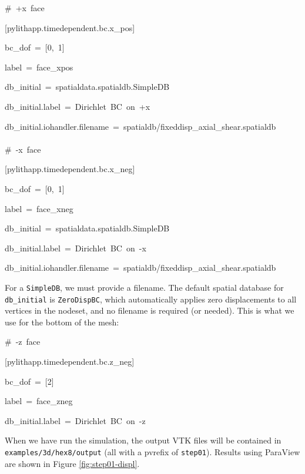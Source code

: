 \begin{lyxcode}
\#~+x~face

{[}pylithapp.timedependent.bc.x\_pos{]}

bc\_dof~=~{[}0,~1{]}

label~=~face\_xpos

db\_initial~=~spatialdata.spatialdb.SimpleDB

db\_initial.label~=~Dirichlet~BC~on~+x

db\_initial.iohandler.filename~=~spatialdb/fixeddisp\_axial\_shear.spatialdb~\\
~\\


\#~-x~face

{[}pylithapp.timedependent.bc.x\_neg{]}

bc\_dof~=~{[}0,~1{]}

label~=~face\_xneg

db\_initial~=~spatialdata.spatialdb.SimpleDB

db\_initial.label~=~Dirichlet~BC~on~-x

db\_initial.iohandler.filename~=~spatialdb/fixeddisp\_axial\_shear.spatialdb
\end{lyxcode}
For a \texttt{SimpleDB}, we must provide a filename. The default spatial
database for \texttt{db\_initial} is \texttt{ZeroDispBC}, which automatically
applies zero displacements to all vertices in the nodeset, and no
filename is required (or needed). This is what we use for the bottom
of the mesh:
\begin{lyxcode}
\#~-z~face

{[}pylithapp.timedependent.bc.z\_neg{]}

bc\_dof~=~{[}2{]}

label~=~face\_zneg

db\_initial.label~=~Dirichlet~BC~on~-z
\end{lyxcode}
When we have run the simulation, the output VTK files will be contained
in \texttt{examples/3d/hex8/output} (all with a pvrefix of \texttt{step01}).
Results using ParaView are shown in Figure \vref{fig:step01-displ}.

